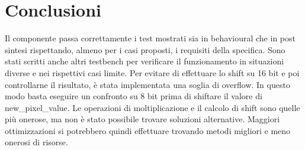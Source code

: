 \documentclass{article}
\begin{document}
\pagebreak

\section{Conclusioni}
Il componente passa correttamente i test mostrati sia in behavioural che in post sintesi rispettando, almeno per i casi proposti, i requisiti della specifica. Sono stati scritti anche altri testbench per verificare il funzionamento in situazioni diverse e nei rispettivi casi limite. Per evitare di effettuare lo shift su 16 bit e poi controllarne il risultato, è stata implementata una soglia di overflow. In questo modo basta eseguire un confronto su 8 bit prima di shiftare il valore di new\_pixel\_value. Le operazioni di moltiplicazione e il calcolo di shift sono quelle più onerose, ma non è stato possibile trovare soluzioni alternative. Maggiori ottimizzazioni si potrebbero quindi effettuare trovando metodi migliori e meno onerosi di risorse.

\printbibliography
\end{document}
